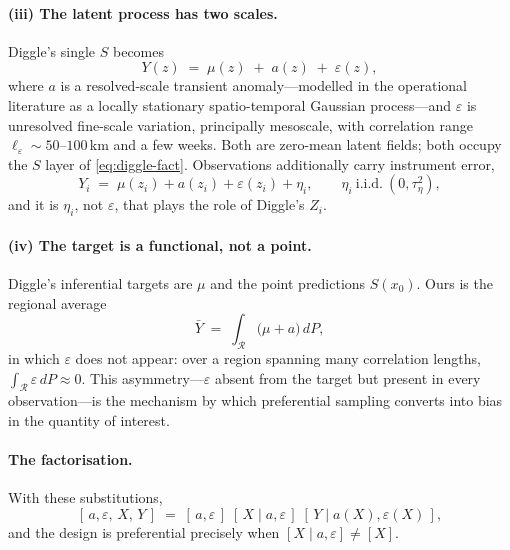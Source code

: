 \documentclass[11pt]{article}
\begin{document}
\paragraph{(iii) The latent process has two scales.} Diggle's single $S$ becomes
\begin{equation}
  \label{eq:model}
  Y(z) \;=\; \mu(z) \;+\; a(z) \;+\; \varepsilon(z),
\end{equation}
where $a$ is a resolved-scale transient anomaly---modelled in the operational literature as a
locally stationary spatio-temporal Gaussian process---and $\varepsilon$ is unresolved
fine-scale variation, principally mesoscale, with correlation range
$\ell_\varepsilon \sim 50$--$100$\,km and a few weeks. Both are zero-mean latent fields; both
occupy the $S$ layer of \eqref{eq:diggle-fact}. Observations additionally carry instrument
error,
\begin{equation}
  \label{eq:obs}
  Y_i \;=\; \mu(z_i) + a(z_i) + \varepsilon(z_i) + \eta_i,
  \qquad \eta_i \ \text{i.i.d.}\ (0, \tau_\eta^2),
\end{equation}
and it is $\eta_i$, not $\varepsilon$, that plays the role of Diggle's $Z_i$.

\paragraph{(iv) The target is a functional, not a point.} Diggle's inferential targets are
$\mu$ and the point predictions $S(x_0)$. Ours is the regional average
\begin{equation}
  \label{eq:target}
  \bar{Y} \;=\; \int_{\mathcal{R}} \big(\mu + a\big) \, dP ,
\end{equation}
in which $\varepsilon$ does not appear: over a region spanning many correlation lengths,
$\int_{\mathcal{R}} \varepsilon\,dP \approx 0$. This asymmetry---$\varepsilon$ absent from the
target but present in every observation---is the mechanism by which preferential sampling
converts into bias in the quantity of interest.

\paragraph{The factorisation.} With these substitutions,
\begin{equation}
  \label{eq:ourfact}
  [\,a,\varepsilon,\,X,\,Y\,] \;=\;
  [\,a,\varepsilon\,]\;[\,X \mid a,\varepsilon\,]\;[\,Y \mid a(X), \varepsilon(X)\,] ,
\end{equation}
and the design is preferential precisely when $[X \mid a, \varepsilon] \neq [X]$.
\end{document}
